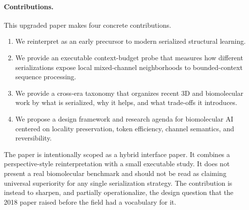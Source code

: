 \paragraph{Contributions.}
This upgraded paper makes four concrete contributions.
\begin{enumerate}[leftmargin=1.4em]
  \item We reinterpret \citet{corcoran2018spatial} as an early precursor to modern serialized structural learning.
  \item We provide an executable context-budget probe that measures how different serializations expose local mixed-channel neighborhoods to bounded-context sequence processing.
  \item We provide a cross-era taxonomy that organizes recent 3D and biomolecular work by what is serialized, why it helps, and what trade-offs it introduces.
  \item We propose a design framework and research agenda for biomolecular AI centered on locality preservation, token efficiency, channel semantics, and reversibility.
\end{enumerate}

The paper is intentionally scoped as a hybrid interface paper. It combines a perspective-style reinterpretation with a small executable study. It does not present a real biomolecular benchmark and should not be read as claiming universal superiority for any single serialization strategy. The contribution is instead to sharpen, and partially operationalize, the design question that the 2018 paper raised before the field had a vocabulary for it.
